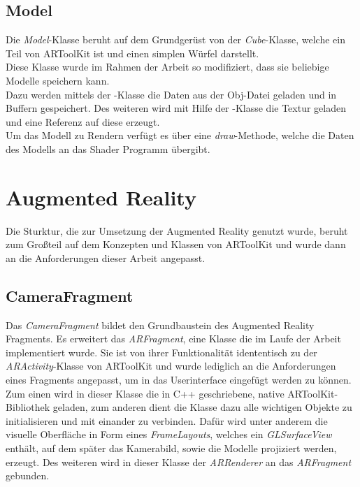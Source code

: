 \subsection{Model}\label{sec:model}
Die \textit{Model}-Klasse beruht auf dem Grundgerüst von der \textit{Cube}-Klasse, welche ein Teil von ARToolKit ist und einen simplen Würfel darstellt.\\
Diese Klasse wurde im Rahmen der Arbeit so modifiziert, dass sie beliebige Modelle speichern kann.\\
Dazu werden mittels der \textit{}-Klasse die Daten aus der Obj-Datei geladen und in Buffern gespeichert. Des weiteren wird mit Hilfe der -Klasse die Textur geladen und eine Referenz auf diese erzeugt.\\
Um das Modell zu Rendern verfügt es über eine \textit{draw}-Methode, welche die Daten des Modells an das Shader Programm übergibt.

\section{Augmented Reality}
Die Sturktur, die zur Umsetzung der Augmented Reality genutzt wurde, beruht zum Großteil auf dem Konzepten und Klassen von ARToolKit und wurde dann an die Anforderungen dieser Arbeit angepasst.

\subsection{CameraFragment}
Das \textit{CameraFragment} bildet den Grundbaustein des Augmented Reality Fragments. Es erweitert das \textit{ARFragment}, eine Klasse die im Laufe der Arbeit implementiert wurde. Sie ist von ihrer Funktionalität idententisch zu der \textit{ARActivity}-Klasse von ARToolKit und wurde lediglich an die Anforderungen eines Fragments angepasst, um in das Userinterface eingefügt werden zu können.\\
Zum einen wird in dieser Klasse die in C++ geschriebene, native ARToolKit-Bibliothek geladen, zum anderen dient die Klasse dazu alle wichtigen Objekte zu initialisieren und mit einander zu verbinden.
Dafür wird unter anderem die visuelle Oberfläche in Form eines \textit{FrameLayouts}, welches ein \textit{GLSurfaceView} enthält, auf dem später das Kamerabild, sowie die Modelle projiziert werden, erzeugt.
Des weiteren wird in dieser Klasse der \textit{ARRenderer} an das \textit{ARFragment} gebunden.

